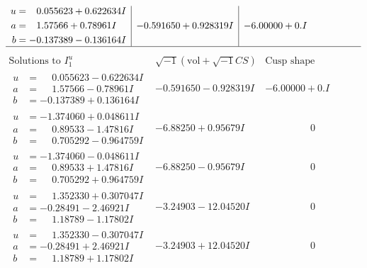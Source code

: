 \documentclass[1p]{elsarticle_modified}
\theoremstyle{definition}
\newcommand{\I}{\sqrt{-1}}
\begin{document}
$$\begin{array}{c|c|c}
\begin{aligned}
u &= \phantom{-}0.055623 + 0.622634 I \\
a &= \phantom{-}1.57566 + 0.78961 I \\
b &= -0.137389 - 0.136164 I\end{aligned}
 & -0.591650 + 0.928319 I & -6.00000 + 0. I\phantom{ +0.000000I}\\
 \hline 
 \end{array}$$\newpage$$\begin{array}{c|c|c}  
\text{Solutions to }I^u_{1}& \I (\text{vol} + \sqrt{-1}CS) & \text{Cusp shape}\\
 \hline 
\begin{aligned}
u &= \phantom{-}0.055623 - 0.622634 I \\
a &= \phantom{-}1.57566 - 0.78961 I \\
b &= -0.137389 + 0.136164 I\end{aligned}
 & -0.591650 - 0.928319 I & -6.00000 + 0. I\phantom{ +0.000000I} \\ \hline\begin{aligned}
u &= -1.374060 + 0.048611 I \\
a &= \phantom{-}0.89533 - 1.47816 I \\
b &= \phantom{-}0.705292 - 0.964759 I\end{aligned}
 & -6.88250 + 0.95679 I & \phantom{-0.000000 } 0 \\ \hline\begin{aligned}
u &= -1.374060 - 0.048611 I \\
a &= \phantom{-}0.89533 + 1.47816 I \\
b &= \phantom{-}0.705292 + 0.964759 I\end{aligned}
 & -6.88250 - 0.95679 I & \phantom{-0.000000 } 0 \\ \hline\begin{aligned}
u &= \phantom{-}1.352330 + 0.307047 I \\
a &= -0.28491 - 2.46921 I \\
b &= \phantom{-}1.18789 - 1.17802 I\end{aligned}
 & -3.24903 - 12.04520 I & \phantom{-0.000000 } 0 \\ \hline\begin{aligned}
u &= \phantom{-}1.352330 - 0.307047 I \\
a &= -0.28491 + 2.46921 I \\
b &= \phantom{-}1.18789 + 1.17802 I\end{aligned}
 & -3.24903 + 12.04520 I & \phantom{-0.000000 } 0 \\ \hline\begin{aligned}

\end{aligned}
\end{array}$$
\end{document}
